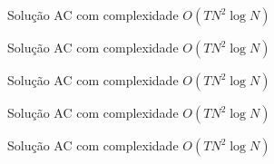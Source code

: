 \begin{frame}[fragile]{Solução AC com complexidade $O(TN^2\log N)$}
\end{frame}

\begin{frame}[fragile]{Solução AC com complexidade $O(TN^2\log N)$}
\end{frame}

\begin{frame}[fragile]{Solução AC com complexidade $O(TN^2\log N)$}
\end{frame}

\begin{frame}[fragile]{Solução AC com complexidade $O(TN^2\log N)$}
\end{frame}

\begin{frame}[fragile]{Solução AC com complexidade $O(TN^2\log N)$}
\end{frame}
